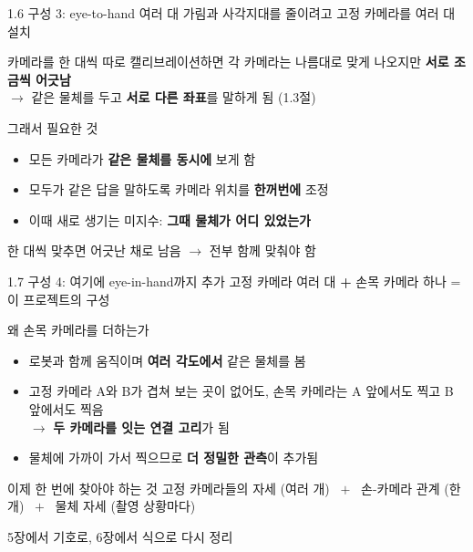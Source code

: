 \documentclass[aspectratio=169,11pt]{beamer}
\begin{document}
\begin{frame}{1.6 구성 3: eye-to-hand 여러 대}
  가림과 사각지대를 줄이려고 고정 카메라를 여러 대 설치
  \vfill
  \begin{alertblock}{카메라를 한 대씩 따로 캘리브레이션하면}
    각 카메라는 나름대로 맞게 나오지만 \textbf{서로 조금씩 어긋남}\\
    $\rightarrow$ 같은 물체를 두고 \textbf{서로 다른 좌표}를 말하게 됨 (1.3절)
  \end{alertblock}
  \vfill
  \begin{block}{그래서 필요한 것}
    \begin{itemize}
      \item 모든 카메라가 \textbf{같은 물체를 동시에} 보게 함
      \item 모두가 같은 답을 말하도록 카메라 위치를 \textbf{한꺼번에} 조정
      \item 이때 새로 생기는 미지수: \textbf{그때 물체가 어디 있었는가}
    \end{itemize}
  \end{block}
  \vfill
  \centering
  {\small 한 대씩 맞추면 어긋난 채로 남음 $\rightarrow$ 전부 함께 맞춰야 함}
\end{frame}

\begin{frame}{1.7 구성 4: 여기에 eye-in-hand까지 추가}
  고정 카메라 여러 대 \textbf{+} 손목 카메라 하나 = 이 프로젝트의 구성
  \vfill
  \begin{block}{왜 손목 카메라를 더하는가}
    \begin{itemize}
      \item 로봇과 함께 움직이며 \textbf{여러 각도에서} 같은 물체를 봄
      \item 고정 카메라 A와 B가 겹쳐 보는 곳이 없어도,
        손목 카메라는 A 앞에서도 찍고 B 앞에서도 찍음\\
        $\rightarrow$ \textbf{두 카메라를 잇는 연결 고리}가 됨
      \item 물체에 가까이 가서 찍으므로 \textbf{더 정밀한 관측}이 추가됨
    \end{itemize}
  \end{block}
  \vfill
  \begin{alertblock}{이제 한 번에 찾아야 하는 것}
    고정 카메라들의 자세 (여러 개) \ $+$ \ 손-카메라 관계 (한 개)
    \ $+$ \ 물체 자세 (촬영 상황마다)
  \end{alertblock}
  \vfill
  \centering
  {\small 5장에서 기호로, 6장에서 식으로 다시 정리}
\end{frame}
\end{document}
